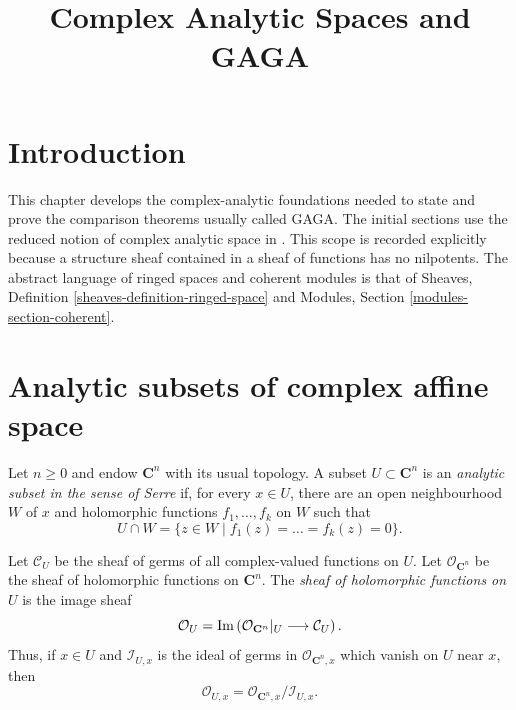 


%


\title{Complex Analytic Spaces and GAGA}

\maketitle

\label{section-phantom}

\tableofcontents

\section{Introduction}
\label{section-introduction}

\noindent
This chapter develops the complex-analytic foundations needed to state and
prove the comparison theorems usually called GAGA. The initial sections use
the reduced notion of complex analytic space in
\cite[\S 1, nos. 1--4, pp. 3--7]{GAGA}. This scope is recorded explicitly
because a structure sheaf contained in a sheaf of functions has no
nilpotents. The abstract language of ringed spaces and coherent modules is
that of Sheaves, Definition \ref{sheaves-definition-ringed-space} and
Modules, Section \ref{modules-section-coherent}.

\section{Analytic subsets of complex affine space}
\label{section-analytic-subsets}

\begin{definition}
\label{definition-analytic-subset}
\begin{reference}
\cite[\S 1, no. 1, pp. 3--4]{GAGA}
\end{reference}
Let $n \geq 0$ and endow $\mathbf C^n$ with its usual topology. A subset
$U \subset \mathbf C^n$ is an {\it analytic subset in the sense of Serre}
if, for every $x \in U$, there are an open neighbourhood $W$ of $x$ and
holomorphic functions $f_1, \ldots, f_k$ on $W$ such that
$$
U \cap W = \{z \in W \mid f_1(z)=\ldots=f_k(z)=0\}.
$$

Let $\mathcal C_U$ be the sheaf of germs of all complex-valued functions on
$U$. Let $\mathcal O_{\mathbf C^n}$ be the sheaf of holomorphic functions on
$\mathbf C^n$. The {\it sheaf of holomorphic functions on $U$} is the image
sheaf
$$
\mathcal O_U =
\mathop{\rm Im}\left(
\mathcal O_{\mathbf C^n}|_U \longrightarrow \mathcal C_U
\right).
$$
Thus, if $x \in U$ and $\mathcal I_{U,x}$ is the ideal of germs in
$\mathcal O_{\mathbf C^n,x}$ which vanish on $U$ near $x$, then
$$
\mathcal O_{U,x}=
\mathcal O_{\mathbf C^n,x}/\mathcal I_{U,x}.
$$
\end{definition}

